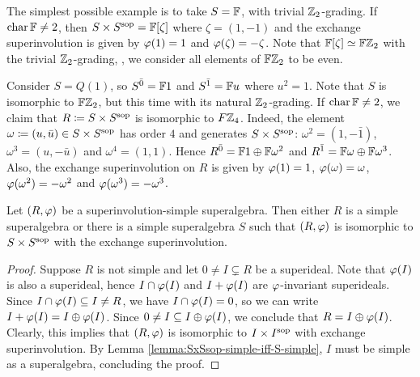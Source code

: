 \begin{ex}\label{ex:FxF-iso-FZ2}
    The simplest possible example is to take $S = \mathbb{F}$, with trivial $\mathbb{Z}_2$-grading. 
    If $\operatorname{char} \mathbb{F} \neq 2$, then $S\times S^{\mathrm{sop}} = \mathbb{F} [\zeta]$ where $\zeta = (1, -1)$ and the exchange superinvolution is given by $\varphi(1) = 1$ and $\varphi(\zeta) = -\zeta$.
    Note that $\mathbb{F} [\zeta] \simeq \mathbb{F}\mathbb{Z}_2$ with the trivial $\mathbb{Z}_2$-grading, \ie, we consider all elements of $\mathbb{F}\mathbb{Z}_2$ to be even.
\end{ex}

\begin{ex}\label{ex:FZ2xFZ2sop-iso-FZ4}
    Consider $S = Q(1)$, so $S^{\bar0} = \mathbb{F} 1$ and $S^{\bar1} = \mathbb{F} u$ where $u^2 =1$. 
    Note that $S$ is isomorphic to $\mathbb{F}\mathbb{Z}_2$, but this time with its natural $\mathbb{Z}_2$-grading.
    If $\operatorname{char} \mathbb{F} \neq 2$, we claim that $R \coloneqq S\times S^{\mathrm{sop}}$ is isomorphic to $F\mathbb{Z}_4$. 
    Indeed, the element $\omega \coloneqq (u, \bar u) \in S\times S^{\mathrm{sop}}$ has order $4$ and generates $S\times S^{\mathrm{sop}}$: $\omega^2 = (1, - \bar 1)$, $\omega^3 = (u, - \bar u)$ and $\omega^4 = (1, 1)$. 
    Hence $R^{\bar0} = \mathbb{F}1 \oplus \mathbb{F} \omega^2$ and $R^{\bar1} = \mathbb{F} \omega \oplus \mathbb{F} \omega^3$.
    Also, the exchange superinvolution on $R$ is given by $\varphi(1) = 1$, $\varphi(\omega) = \omega$, $\varphi(\omega^2) = -\omega^2$ and $\varphi(\omega^3) = -\omega^3$.
\end{ex}

\begin{prop}\label{prop:only-SxSsop-is-simple}
    Let $(R, \varphi)$ be a superinvolution-simple superalgebra.
    Then either $R$ is a simple superalgebra or there is a simple superalgebra $S$ such that $(R, \varphi)$ is isomorphic to $S\times S^{\mathrm{sop}}$ with the exchange superinvolution. 
\end{prop}

\begin{proof}
    Suppose $R$ is not simple and let $0 \neq I \subsetneq R$ be a superideal. 
    Note that $\varphi(I)$ is also a superideal, hence $I \cap \varphi(I)$ and $I + \varphi (I)$ are $\varphi$-invariant superideals. 
    Since $I \cap \varphi(I) \subseteq I \neq R$, we have $I \cap \varphi(I) = 0$, so we can write $I + \varphi (I) = I \oplus \varphi (I)$. 
    Since $0 \neq I \subseteq I \oplus \varphi (I)$, we conclude that $R = I \oplus \varphi (I)$.
    Clearly, this implies that $(R, \varphi)$ is isomorphic to $I \times I^{\mathrm{sop}}$ with exchange superinvolution. 
    By Lemma \ref{lemma:SxSsop-simple-iff-S-simple}, $I$ must be simple as a superalgebra, concluding the proof.
\end{proof}

